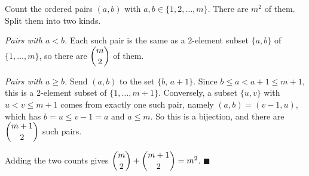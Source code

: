 Count the ordered pairs $(a,b)$ with $a,b\in\{1,2,\dots,m\}$. There are $m^2$ of them. Split them into two kinds.

\emph{Pairs with $a<b$.} Each such pair is the same as a $2$-element subset $\{a,b\}$ of $\{1,\dots,m\}$, so there are $\dbinom m2$ of them.

\emph{Pairs with $a\ge b$.} Send $(a,b)$ to the set $\{b,\,a+1\}$. Since $b\le a<a+1\le m+1$, this is a $2$-element subset of $\{1,\dots,m+1\}$. Conversely, a subset $\{u,v\}$ with $u<v\le m+1$ comes from exactly one such pair, namely $(a,b)=(v-1,u)$, which has $b=u\le v-1=a$ and $a\le m$. So this is a bijection, and there are $\dbinom{m+1}2$ such pairs.

Adding the two counts gives $\dbinom m2+\dbinom{m+1}2=m^2$. $\blacksquare$
